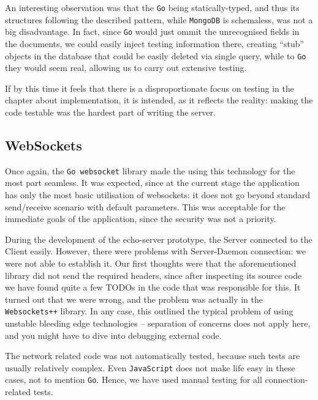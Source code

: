 \documentclass{l3proj}
\begin{document}
An interesting observation was that the \texttt{Go} being statically-typed, and thus its structures following the described pattern, while \texttt{MongoDB} is schemaless, was not a big disadvantage. In fact, since \texttt{Go} would just ommit the unrecognised fields in the documents, we could easily inject testing information there, creating ``stub'' objects in the database that could be easily deleted via single query, while to \texttt{Go} they would seem real, allowing us to carry out extensive testing.

If by this time it feels that there is a disproportionate focus on testing in the chapter about implementation, it is intended, as it reflects the reality: making the code testable was the hardest part of writing the server.

\subsection{WebSockets}

Once again, the \texttt{Go websocket} library made the using this technology for the most part seamless. It was expected, since at the current stage the application has only the most basic utilisation of websockets: it does not go beyond standard send/receive scenario with default parameters. This was acceptable for the immediate goals of the application, since the security was not a priority.

During the development of the echo-server prototype, the Server connected to the Client easily. However, there were problems with Server-Daemon connection: we were not able to establish it. Our first thoughts were that the aforementioned library did not send the required headers, since after inspecting its source code we have found quite a few TODOs in the code that was responsible for this. It turned out that we were wrong, and the problem was actually in the \texttt{Websockets++} library. In any case, this outlined the typical problem of using unstable bleeding edge technologies -- separation of concerns does not apply here, and you might have to dive into debugging external code.

The network related code was not automatically tested, because such tests are usually relatively complex. Even \texttt{JavaScript} does not make life easy in these cases, not to mention \texttt{Go}. Hence, we have used manual testing for all connection-related tests.

\end{document}
